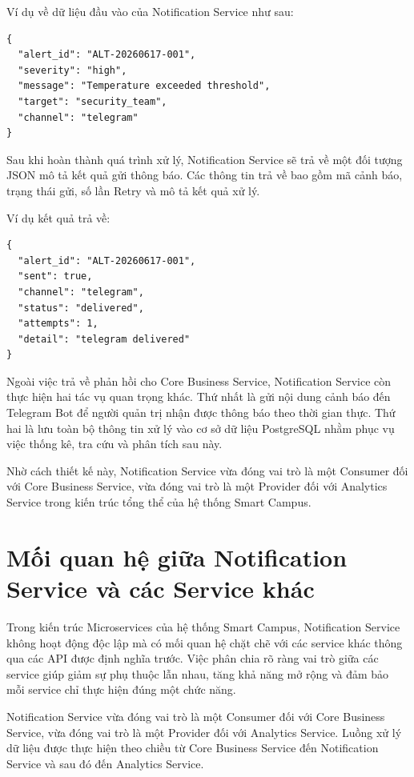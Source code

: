 Ví dụ về dữ liệu đầu vào của Notification Service như sau:

\begin{verbatim}
{
  "alert_id": "ALT-20260617-001",
  "severity": "high",
  "message": "Temperature exceeded threshold",
  "target": "security_team",
  "channel": "telegram"
}
\end{verbatim}

Sau khi hoàn thành quá trình xử lý, Notification Service sẽ trả về một đối tượng JSON mô tả kết quả gửi thông báo. Các thông tin trả về bao gồm mã cảnh báo, trạng thái gửi, số lần Retry và mô tả kết quả xử lý.

Ví dụ kết quả trả về:

\begin{verbatim}
{
  "alert_id": "ALT-20260617-001",
  "sent": true,
  "channel": "telegram",
  "status": "delivered",
  "attempts": 1,
  "detail": "telegram delivered"
}
\end{verbatim}

Ngoài việc trả về phản hồi cho Core Business Service, Notification Service còn thực hiện hai tác vụ quan trọng khác. Thứ nhất là gửi nội dung cảnh báo đến Telegram Bot để người quản trị nhận được thông báo theo thời gian thực. Thứ hai là lưu toàn bộ thông tin xử lý vào cơ sở dữ liệu PostgreSQL nhằm phục vụ việc thống kê, tra cứu và phân tích sau này.

Nhờ cách thiết kế này, Notification Service vừa đóng vai trò là một Consumer đối với Core Business Service, vừa đóng vai trò là một Provider đối với Analytics Service trong kiến trúc tổng thể của hệ thống Smart Campus.

\section{Mối quan hệ giữa Notification Service và các Service khác}

Trong kiến trúc Microservices của hệ thống Smart Campus, Notification Service không hoạt động độc lập mà có mối quan hệ chặt chẽ với các service khác thông qua các API được định nghĩa trước. Việc phân chia rõ ràng vai trò giữa các service giúp giảm sự phụ thuộc lẫn nhau, tăng khả năng mở rộng và đảm bảo mỗi service chỉ thực hiện đúng một chức năng.

Notification Service vừa đóng vai trò là một Consumer đối với Core Business Service, vừa đóng vai trò là một Provider đối với Analytics Service. Luồng xử lý dữ liệu được thực hiện theo chiều từ Core Business Service đến Notification Service và sau đó đến Analytics Service.

